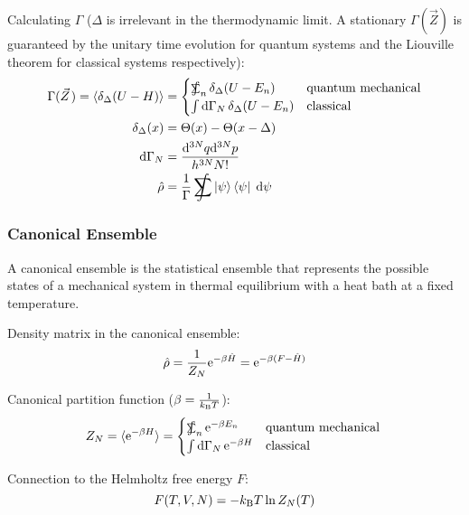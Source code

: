 			\noindent
			Calculating $\Gamma$ ($\Delta$ is irrelevant in the thermodynamic limit. A stationary $\Gamma(\vec{Z})$ is guaranteed by the unitary time evolution for quantum systems and the Liouville theorem for classical systems respectively):
			\begin{equation}
				\begin{aligned}
					\Gamma(\vec{Z}) = \langle \delta_\Delta (U-H) \rangle
					&= \begin{cases}
						\SumInt_n \delta_\Delta(U-E_n) & \text{quantum mechanical} \\
						\int \dd \Gamma_N \, \delta_\Delta(U-E_n) & \text{classical}
					\end{cases} \\
					\delta_\Delta(x) &= \Theta(x) - \Theta(x-\Delta)\\
					\dd \Gamma_N &= \frac{\dd^{3N}q \dd^{3N}p }{h^{3N} N!} \\
					\hat{\rho} &= \frac{1}{\Gamma} \SumInt \Ket{\psi}\Bra{\psi}\;\dd\psi
				\end{aligned}
			\end{equation}

		\subsubsection{Canonical Ensemble}
			A canonical ensemble is the statistical ensemble that represents the possible states of a mechanical system in thermal equilibrium with a heat bath at a fixed temperature.

			Density matrix in the canonical ensemble:
			\begin{equation}
				\hat{\rho} = \frac{1}{Z_N} \mathrm{e}^{-\beta \hat{H}} = \mathrm{e}^{-\beta (F-\hat{H})}
			\end{equation}

			\noindent
			Canonical partition function ($\beta = \frac{1}{k_{\text{B}} T}$):
			\begin{equation}
				Z_N=\langle \ex^{-\beta H} \rangle
				= \begin{cases}
					\SumInt_n \ex^{-\beta E_n} & \text{quantum mechanical} \\
					\int \dd \Gamma_N \, \ex^{-\beta H} & \text{classical}
				\end{cases} \\
			\end{equation}

			\noindent
			Connection to the Helmholtz free energy $F$:
			\begin{equation}
				F(T, V, N) = -k_{\text{B}} T \ln{Z_N(T)}
			\end{equation}

